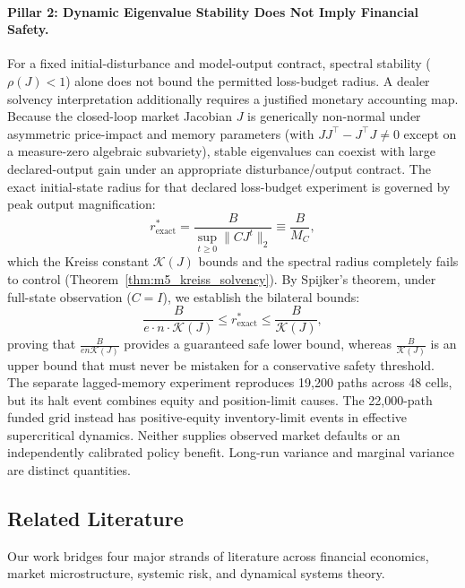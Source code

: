 \documentclass[12pt]{article}
\theoremstyle{definition}
\theoremstyle{remark}
\begin{document}
\paragraph{Pillar 2: Dynamic Eigenvalue Stability Does Not Imply Financial Safety.}
For a fixed initial-disturbance and model-output contract, spectral stability ($\rho(J)<1$) alone does not bound the permitted loss-budget radius. A dealer solvency interpretation additionally requires a justified monetary accounting map. Because the closed-loop market Jacobian $J$ is generically non-normal under asymmetric price-impact and memory parameters (with $J J^\top - J^\top J \neq 0$ except on a measure-zero algebraic subvariety), stable eigenvalues can coexist with large declared-output gain under an appropriate disturbance/output contract. The exact initial-state radius for that declared loss-budget experiment is governed by peak output magnification:
\begin{equation}
r^*_{\text{exact}} = \frac{B}{\sup_{t \ge 0} \|C J^t\|_2} \equiv \frac{B}{M_C},
\end{equation}
which the Kreiss constant $\mathcal{K}(J)$ bounds and the spectral radius completely fails to control (Theorem~\ref{thm:m5_kreiss_solvency}). By Spijker's theorem, under full-state observation ($C = I$), we establish the bilateral bounds:
\begin{equation}
\frac{B}{e \cdot n \cdot \mathcal{K}(J)} \le r^*_{\text{exact}} \le \frac{B}{\mathcal{K}(J)},
\end{equation}
proving that $\frac{B}{e n \mathcal{K}(J)}$ provides a guaranteed safe lower bound, whereas $\frac{B}{\mathcal{K}(J)}$ is an upper bound that must never be mistaken for a conservative safety threshold. The separate lagged-memory experiment reproduces 19,200 paths across 48 cells, but its halt event combines equity and position-limit causes. The 22,000-path funded grid instead has positive-equity inventory-limit events in effective supercritical dynamics. Neither supplies observed market defaults or an independently calibrated policy benefit. Long-run variance and marginal variance are distinct quantities.

\subsection{Related Literature}
Our work bridges four major strands of literature across financial economics, market microstructure, systemic risk, and dynamical systems theory.
\end{document}
